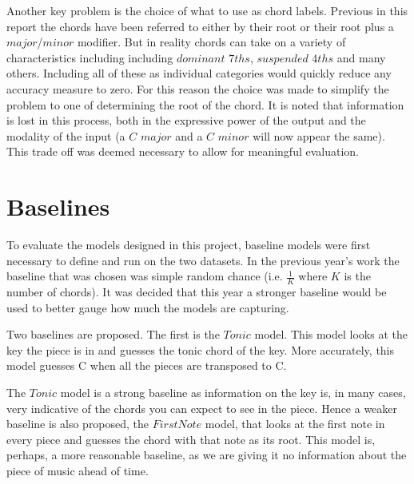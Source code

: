 \documentclass[bsc,singlespacing,logo, parskip, deptreport]{infthesis}
\begin{document}
Another key problem is the choice of what to use as chord labels. Previous in this report the chords have been referred to either by their root or their root plus a $major$/$minor$ modifier. But in reality chords can take on a variety of characteristics including including $dominant$ $7ths$, $suspended$ $4ths$ and many others. Including all of these as individual categories would quickly reduce any accuracy measure to zero. For this reason the choice was made to simplify the problem to one of determining the root of the chord. It is noted that information is lost in this process, both in the expressive power of the output and the modality of the input (a $C$ $major$ and a $C$ $minor$ will now appear the same). This trade off was deemed necessary to allow for meaningful evaluation.

\section{Baselines}


To evaluate the models designed in this project, baseline models were first necessary to define and run on the two datasets. In the previous year's work the baseline that was chosen was simple random chance (i.e. $\frac{1}{K}$ where $K$ is the number of chords). It was decided that this year a stronger baseline would be used to better gauge how much the models are capturing.

Two baselines are proposed. The first is the $Tonic$ model. This model looks at the key the piece is in and guesses the tonic chord of the key. More accurately, this model guesses C when all the pieces are transposed to C.

The $Tonic$ model is a strong baseline as information on the key is, in many cases, very indicative of the chords you can expect to see in the piece. Hence a weaker baseline is also proposed, the $First Note$ model, that looks at the first note in every piece and guesses the chord with that note as its root. This model is, perhaps, a more reasonable baseline, as we are giving it no information about the piece of music ahead of time.
\end{document}
